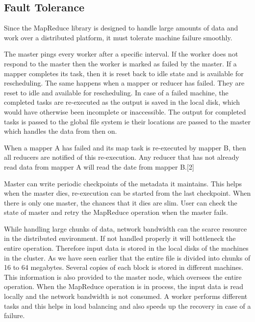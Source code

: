 \documentclass[sigconf]{acmart}
\begin{document}
\subsection{Fault Tolerance}
\par Since the MapReduce library is designed to handle large amounts of data and work over a distributed platform, it must tolerate machine failure smoothly. 

\par The master pings every worker after a specific interval. If the worker does not respond to the master then the worker is marked as failed by the master. If a mapper completes its task, then it is reset back to idle state and is available for rescheduling. The same happens when a mapper or reducer has failed. They are reset to idle and available for rescheduling. In case of a failed machine, the completed tasks are re-executed as the output is saved in the local disk, which would have otherwise been incomplete or inaccessible. The output for completed tasks is passed to the global file system ie their locations are passed to the master which handles the data from then on.  
\par When a mapper A has failed and its map task is re-executed by mapper B, then all reducers are notified of this re-execution. Any reducer that has not already read data from mapper A will read the date from mapper B.[2] 
\par Master can write periodic checkpoints of the metadata it maintains. This helps when the master dies, re-execution can be started from the last checkpoint. When there is only one master, the chances that it dies are slim. User can check the state of master and retry the MapReduce operation when the master fails.
\par While handling large chunks of data, network bandwidth can the scarce resource in the distributed environment. If not handled properly it will bottleneck the entire operation. Therefore input data is stored in the local disks of the machines in the cluster. As we have seen earlier that the entire file is divided into chunks of 16 to 64 megabytes. Several copies of each block is stored in different machines. This information is also provided to the master node, which oversees the entire operation. When the MapReduce operation is in process, the input data is read locally and the network bandwidth is not consumed. A worker performs different tasks and this helps in load balancing and also speeds up the recovery in case of a failure.  
\end{document}
